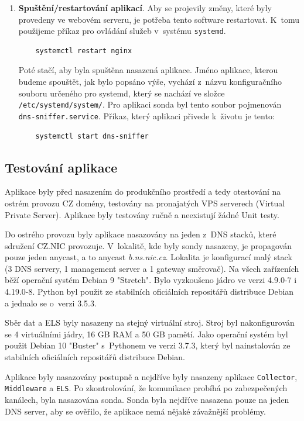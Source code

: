 \documentclass[thesis=M,czech]{src/FITthesis}[2019/12/23]
\begin{document}
\begin{enumerate}
\begin{enumerate}[i]
\begin{verbatim}
			\end{verbatim}
	\end{enumerate}
	
	\item \textbf{Spuštění/restartování aplikací}. Aby se projevily změny, které byly provedeny ve webovém serveru, je potřeba tento software restartovat. K~tomu použijeme příkaz pro ovládání služeb v~systému \texttt{systemd}.
	\begin{verbatim}
	systemctl restart nginx
	\end{verbatim}
	
	Poté stačí, aby byla spuštěna nasazená aplikace. Jméno aplikace, kterou budeme spouštět, jak bylo popsáno výše, vychází z~názvu konfiguračního souboru určeného pro systemd, který se nachází ve složce \texttt{/etc/systemd/system/}. Pro aplikaci sonda byl tento soubor pojmenován \texttt{dns-sniffer.service}. Příkaz, který aplikaci přivede k~životu je tento:
	\begin{verbatim}
	systemctl start dns-sniffer
	\end{verbatim}
\end{enumerate} 


\subsection{Testování aplikace}
\label{sec:testing}
Aplikace byly před nasazením do produkčního prostředí a tedy otestování na ostrém provozu CZ domény, testovány na pronajatých VPS serverech (Virtual Private Server). Aplikace byly testovány ručně a neexistují žádné Unit testy. 


Do ostrého provozu byly aplikace nasazovány na jeden z~DNS stacků, které sdružení CZ.NIC provozuje. V~lokalitě, kde byly sondy nasazeny, je propagován pouze jeden anycast, a to anycast \textit{b.ns.nic.cz}. Lokalita je konfigurací malý stack (3 DNS servery, 1 management server a 1 gateway směrovač). Na všech zařízeních běží operační systém Debian 9 "Stretch". Bylo vyzkoušeno jádro ve verzi 4.9.0-7 i 4.19.0-8. Python byl použit ze stabilních oficiálních repositářů distribuce Debian a jednalo se o~verzi 3.5.3.


Sběr dat a ELS byly nasazeny na stejný virtuální stroj. Stroj byl nakonfigurován se 4 virtuálními jádry, 16 GB RAM a 50 GB pamětí. Jako operační systém byl použit Debian 10 "Buster" s~Pythonem ve verzi 3.7.3, který byl nainstalován ze stabilních oficiálních repositářů distribuce Debian.

Aplikace byly nasazovány postupně a nejdříve byly nasazeny aplikace \texttt{Collector}, \texttt{Middleware} a \texttt{ELS}. Po zkontrolování, že komunikace probíhá po zabezpečených kanálech, byla nasazována sonda. Sonda byla nejdříve nasazena pouze na jeden DNS server, aby se ověřilo, že aplikace nemá nějaké závažnější problémy.
\end{document}
